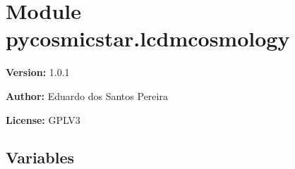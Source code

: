 %
%
%


\section{Module pycosmicstar.lcdmcosmology}

    \label{pycosmicstar:lcdmcosmology}
\textbf{Version:} 1.0.1



\textbf{Author:} Eduardo dos Santos Pereira



\textbf{License:} GPLV3





  \subsection{Variables}

